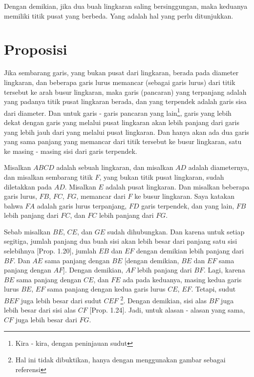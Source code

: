 \documentclass[a4paper]{book}
\begin{document}
Dengan demikian, jika dua buah lingkaran saling bersinggungan, maka keduanya
memiliki titik pusat yang berbeda. Yang adalah hal yang perlu ditunjukkan.

\section*{\centering Proposisi \thesection}
Jika sembarang garis, yang bukan pusat dari lingkaran, berada pada diameter
lingkaran, dan beberapa garis lurus memancar (sebagai garis lurus) dari titik 
tersebut ke arah busur lingkaran, maka garis (pancaran) yang terpanjang adalah 
yang padanya titik pusat lingkaran berada, dan yang terpendek adalah garis 
sisa dari diameter. Dan untuk garis - garis pancaran yang
lain\footnote{Kira - kira, dengan peninjauan sudut}, garis yang lebih dekat 
dengan garis yang melalui pusat lingkaran akan 
lebih panjang dari garis yang lebih jauh dari yang melalui pusat lingkaran. 
Dan hanya akan ada dua garis yang sama panjang yang memancar dari titik 
tersebut ke busur lingkaran, satu ke masing - masing sisi dari garis terpendek.  
\begin{center}
\end{center}

Misalkan $ABCD$ adalah sebuah lingkaran, dan misalkan $AD$ adalah diameternya, 
dan misalkan sembarang titik $F$, yang bukan titik pusat lingkaran, sudah 
diletakkan pada $AD$. Misalkan $E$ adalah pusat lingkaran. Dan misalkan 
beberapa garis lurus, $FB$, $FC$, $FG$, memancar dari $F$ ke busur lingkaran.
Saya katakan bahwa $FA$ adalah garis lurus terpanjang, $FD$ garis terpendek,
dan yang lain,  $FB$ lebih panjang dari $FC$, dan $FC$ lebih panjang dari 
$FG$.

Sebab misalkan $BE$, $CE$, dan $GE$ sudah dihubungkan. Dan karena untuk setiap
segitiga, jumlah panjang dua buah sisi akan lebih besar dari panjang satu sisi 
selebihnya [Prop. 1.20], jumlah $EB$ dan $EF$ dengan demikian lebih panjang 
dari
$BF$. Dan $AE$ sama panjang dengan $BE$ [dengan demikian, $BE$ dan $EF$ sama
panjang dengan $AF$]. Dengan demikian, $AF$ lebih panjang dari $BF$. Lagi,
karena $BE$ sama panjang dengan $CE$, dan $FE$ ada pada keduanya, masing
kedua garis lurus $BE$, $EF$ sama panjang dengan kedua garis lurus $CE$, $EF$.
Tetapi, sudut $BEF$ juga lebih besar dari sudut $CEF$ \footnote{Hal ini tidak
dibuktikan, hanya dengan menggunakan gambar sebagai referensi}. Dengan 
demikian, sisi alas $BF$ juga lebih besar dari sisi alas $CF$ [Prop. 1.24]. 
Jadi, untuk alasan - alasan yang sama, $CF$ juga  lebih besar dari $FG$.
\end{document}
